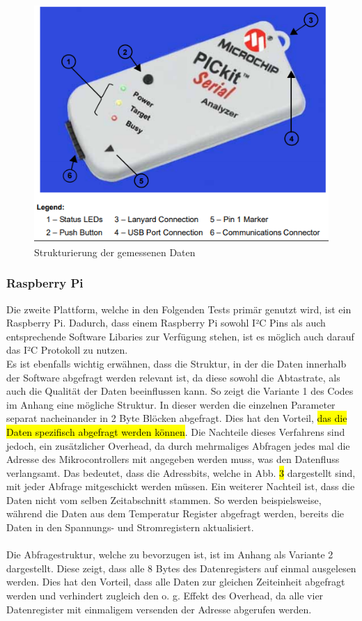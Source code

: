 \begin{figure}[H]
    \centering
    \includegraphics[height= 9cm, width = \textwidth]{Pictures/pickit.png}
    \caption{Strukturierung der gemessenen Daten}
\end{figure}


\subsubsection{Raspberry Pi}
Die zweite Plattform, welche in den Folgenden Tests primär genutzt wird, ist ein Raspberry Pi. Dadurch, dass einem Raspberry Pi sowohl I²C Pins als auch entsprechende Software Libaries zur Verfügung stehen, ist es möglich auch darauf das I²C Protokoll zu nutzen.\\

Es ist ebenfalls wichtig erwähnen, dass die Struktur, in der die Daten innerhalb der Software abgefragt werden relevant ist, da diese sowohl die Abtastrate, als auch die Qualität der Daten beeinflussen kann. So zeigt die Variante 1 des Codes im Anhang eine mögliche Struktur. In dieser werden die einzelnen Parameter separat nacheinander in 2 Byte Blöcken abgefragt. Dies hat den Vorteil, \hl{das die Daten spezifisch abgefragt werden können}. Die Nachteile dieses Verfahrens sind jedoch, ein zusätzlicher Overhead, da durch mehrmaliges Abfragen jedes mal die Adresse des Mikrocontrollers mit angegeben werden muss, was den Datenfluss verlangsamt. Das bedeutet, dass die Adressbits, welche in Abb. \hl{3} dargestellt sind, mit jeder Abfrage mitgeschickt werden müssen. Ein weiterer Nachteil ist, dass die Daten nicht vom selben Zeitabschnitt stammen. So werden beispielsweise, während die Daten aus dem Temperatur Register abgefragt werden, bereits die Daten in den Spannungs- und Stromregistern aktualisiert. \\
\\
Die Abfragestruktur, welche zu bevorzugen ist, ist im Anhang als Variante 2 dargestellt. Diese zeigt, dass alle 8 Bytes des Datenregisters auf einmal ausgelesen werden. Dies hat den Vorteil, dass alle Daten zur gleichen Zeiteinheit abgefragt werden und verhindert zugleich den o. g. Effekt des Overhead, da alle vier Datenregister mit einmaligem versenden der Adresse abgerufen werden. 


